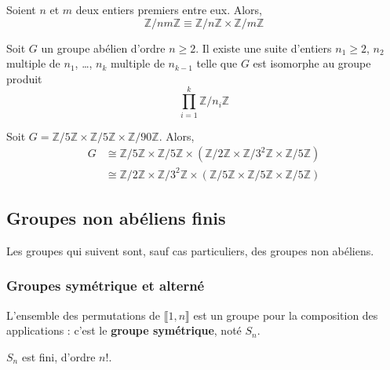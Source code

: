 	
	\begin{theorem}[Chinois]
		Soient $n$ et $m$ deux entiers premiers entre eux. Alors,
		\[ \mathbb{Z}/nm\mathbb{Z} \equiv \mathbb{Z}/n\mathbb{Z} \times \mathbb{Z}/m\mathbb{Z} \]
	\end{theorem}
	
	
	\begin{theorem}[Kronecker]
		Soit $G$ un groupe abélien d'ordre $n \geq 2$. Il existe une suite d'entiers $n_1 \geq 2$, $n_2$ multiple de $n_1$, \dots, $n_k$ multiple de $n_{k-1}$ telle que $G$ est isomorphe au groupe produit
		\[ \prod_{i=1}^k \mathbb{Z}/n_i\mathbb{Z} \]
	\end{theorem}
	
	\begin{example}
		Soit $G = \mathbb{Z}/5\mathbb{Z} \times \mathbb{Z}/5\mathbb{Z} \times \mathbb{Z}/90\mathbb{Z}$. Alors,
		\begin{align*}
			G &\cong \mathbb{Z}/5\mathbb{Z} \times \mathbb{Z}/5\mathbb{Z} \times (\mathbb{Z}/2\mathbb{Z} \times \mathbb{Z}/3^2\mathbb{Z} \times \mathbb{Z}/5\mathbb{Z}) \\
			&\cong \mathbb{Z}/2\mathbb{Z} \times \mathbb{Z}/3^2\mathbb{Z} \times (\mathbb{Z}/5\mathbb{Z} \times \mathbb{Z}/5\mathbb{Z} \times \mathbb{Z}/5\mathbb{Z})
		\end{align*}
	\end{example}
	
	\subsection{Groupes non abéliens finis}
	
	Les groupes qui suivent sont, sauf cas particuliers, des groupes non abéliens.
	
	\subsubsection{Groupes symétrique et alterné}
	
	
	\begin{definition}
		L'ensemble des permutations de $\llbracket 1, n \rrbracket$ est un groupe pour la composition des applications : c'est le \textbf{groupe symétrique}, noté $S_n$.
	\end{definition}
	
	\begin{remark}
		$S_n$ est fini, d'ordre $n!$.
	\end{remark}
	
